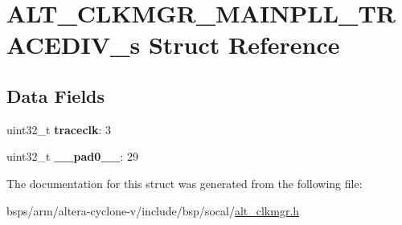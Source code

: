 \hypertarget{structALT__CLKMGR__MAINPLL__TRACEDIV__s}{}\section{A\+L\+T\+\_\+\+C\+L\+K\+M\+G\+R\+\_\+\+M\+A\+I\+N\+P\+L\+L\+\_\+\+T\+R\+A\+C\+E\+D\+I\+V\+\_\+s Struct Reference}
\label{structALT__CLKMGR__MAINPLL__TRACEDIV__s}
\subsection*{Data Fields}
\begin{DoxyCompactItemize}
\item 
\mbox{\label{structALT__CLKMGR__MAINPLL__TRACEDIV__s_abf954752a583d30ad10b912ee287204d}} 
uint32\+\_\+t {\bfseries traceclk}\+: 3
\item 
\mbox{\label{structALT__CLKMGR__MAINPLL__TRACEDIV__s_ab12dd433adedf4ddef6ba295f616da72}} 
uint32\+\_\+t {\bfseries \+\_\+\+\_\+pad0\+\_\+\+\_\+}\+: 29
\end{DoxyCompactItemize}


The documentation for this struct was generated from the following file\+:\begin{DoxyCompactItemize}
\item 
bsps/arm/altera-\/cyclone-\/v/include/bsp/socal/\mbox{\hyperlink{alt__clkmgr_8h}{alt\+\_\+clkmgr.\+h}}\end{DoxyCompactItemize}
